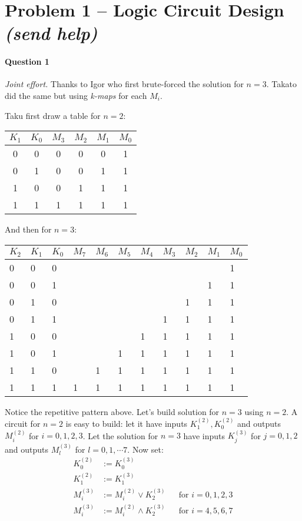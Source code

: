\section{Problem 1 – Logic Circuit Design \textit{(send help)}}

\paragraph{Question 1}
\emph{Joint effort.}
Thanks to Igor who first brute-forced the solution for $n=3$.
Takato did the same but using \emph{k-maps} for each $M_i$.

Taku first draw a table for $n=2$:   

\begin{table}[!h]
\centering
\begin{tabular}{cc|cccc}
$K_1$ & $K_0$ & $M_3$ & $M_2$ & $M_1$ & $M_0$ \\
\hline
0  & 0  & 0  & 0 & 0 & 1 \\
0  & 1  & 0  & 0 & 1 & 1 \\
1  & 0  & 0  & 1 & 1 & 1 \\
1  & 1  & 1  & 1 & 1 & 1
\end{tabular}
\end{table}
And then for $n=3$:
\begin{table}[!h]
\centering
\begin{tabular}{lll|llll|llll}
$K_2$ & $K_1$ & $K_0$ & $M_7$ & $M_6$ & $M_5$ & $M_4$ & $M_3$ & $M_2$ & $M_1$ & $M_0$ \\
\hline
0  & 0  & 0  &    &    &    &    &    &    &    & 1  \\
0  & 0  & 1  &    &    &    &    &    &    & 1  & 1  \\
0  & 1  & 0  &    &    &    &    &    & 1  & 1  & 1  \\
0  & 1  & 1  &    &    &    &    & 1  & 1  & 1  & 1  \\
\hline
1  & 0  & 0  &    &    &    & 1  & 1  & 1  & 1  & 1  \\
1  & 0  & 1  &    &    & 1  & 1  & 1  & 1  & 1  & 1  \\
1  & 1  & 0  &    & 1  & 1  & 1  & 1  & 1  & 1  & 1  \\
1  & 1  & 1  & 1  & 1  & 1  & 1  & 1  & 1  & 1  & 1 
\end{tabular}
\end{table}

Notice the repetitive pattern above.
Let's build solution for $n=3$ using $n=2$.
A circuit for $n=2$ is easy to build: let it have inputs $K_1^{(2)}, K_0^{(2)}$ and outputs $M_i^{(2)}$ for $i=0,1,2,3$.
Let the solution for $n=3$ have inputs $K_j^{(3)}$ for $j=0,1,2$ and outputs $M_l^{(3)}$ for $l=0,1,\cdots7$.
Now set:
\begin{align*}
    K_0^{(2)} &:= K_0^{(3)} \\
    K_1^{(2)} &:= K_1^{(3)} \\
    M_i^{(3)} &:= M_i^{(2)} \lor K_2^{(3)}  && \text{for $i=0,1,2,3$} \\
    M_i^{(3)} &:= M_i^{(2)} \land K_2^{(3)}  && \text{for $i=4,5,6,7$}
\end{align*}

